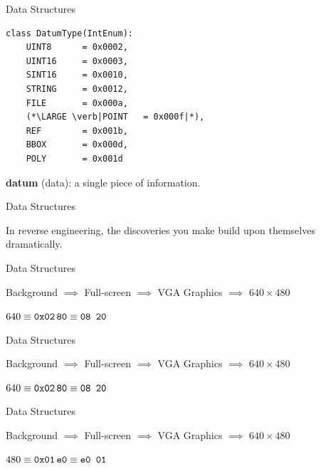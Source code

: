 \documentclass[xcolor={dvipsnames,table},aspectratio=169]{beamer}
\begin{document}
\begin{frame}[fragile]{Data Structures}
\begin{lstlisting}
class DatumType(IntEnum):
    UINT8      = 0x0002,
    UINT16     = 0x0003,
    SINT16     = 0x0010,
    STRING     = 0x0012,
    FILE       = 0x000a,
    (*\LARGE \verb|POINT   = 0x000f|*),
    REF        = 0x001b,
    BBOX       = 0x000d,
    POLY       = 0x001d
\end{lstlisting}
  \begin{center}
    \Large \textbf{datum} (data): a single piece of information.
  \end{center}
\end{frame}

\begin{frame}{Data Structures}
  \begin{center}
    In reverse engineering, the discoveries you make build upon themselves dramatically.
  \end{center}
\end{frame}

\begin{frame}[label=current]{Data Structures}
  \begin{center}
    Background\pause{} $\implies$\pause{} Full-screen $\implies$\pause{} VGA Graphics $\implies$\pause{}
    $640\times 480$
  \end{center}\pause\vspace{-1.5em}
  \begin{center}
    \LARGE $640\equiv \texttt{0x02\,80} \equiv \texttt{08 20}$
  \end{center}
\end{frame}

\begin{frame}[label=current]{Data Structures}
  \begin{center}
    Background $\implies$ Full-screen $\implies$ VGA Graphics $\implies$
    $640\times 480$
  \end{center}\vspace{-1.5em}
  \begin{center}
    \LARGE $640\equiv \texttt{0x02\,80} \equiv \texttt{08 20}$
  \end{center}
\end{frame}

\begin{frame}[label=current]{Data Structures}
  \begin{center}
    Background $\implies$ Full-screen $\implies$ VGA Graphics $\implies$
    $640\times 480$
  \end{center}\vspace{-1.5em}
  \begin{center}
    \LARGE $480\equiv \texttt{0x01\,e0} \equiv \texttt{e0 01}$
  \end{center}
\end{frame}
\end{document}
